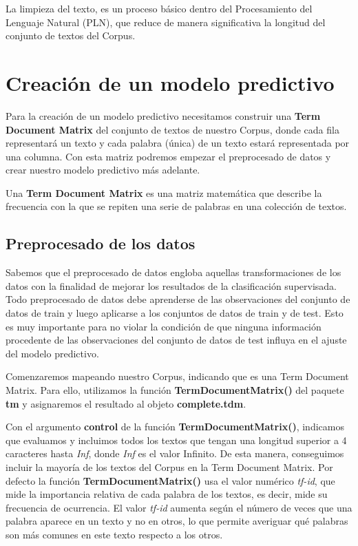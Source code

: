 \documentclass[]{article}
\begin{document}
La limpieza del texto, es un proceso básico dentro del Procesamiento del Lenguaje Natural (PLN), que reduce de manera significativa la longitud del conjunto de textos del Corpus. 

\hypertarget{creaciuxf3n-de-un-modelo-predictivo}{%
\section{Creación de un modelo
predictivo}\label{creaciuxf3n-de-un-modelo-predictivo}}

Para la creación de un modelo predictivo necesitamos construir una \textbf{Term Document Matrix} del conjunto de textos de nuestro Corpus, donde cada fila representará un texto y cada palabra (única) de un texto estará representada por una columna. Con esta matriz podremos empezar el preprocesado de datos y crear nuestro modelo predictivo más adelante.

\begin{tcolorbox}
	Una \textbf{Term Document Matrix} es una matriz matemática que describe la
	frecuencia con la que se repiten una serie de palabras en una colección
	de textos.
\end{tcolorbox}

\hypertarget{preprocesado-de-los-datos}{%
\subsection{Preprocesado de los datos}\label{preprocesado-de-los-datos}}

Sabemos que el preprocesado de datos engloba aquellas transformaciones de los datos con la finalidad de mejorar los resultados de la clasificación supervisada. Todo preprocesado de datos debe
aprenderse de las observaciones del conjunto de datos de train y luego aplicarse a los conjuntos de datos de train y de test. Esto es muy importante para no violar la condición
de que ninguna información procedente de las observaciones del conjunto de datos de test
influya en el ajuste del modelo predictivo.

Comenzaremos mapeando nuestro Corpus, indicando que es una Term
Document Matrix. Para ello, utilizamos la función \textbf{TermDocumentMatrix()} del paquete \textbf{tm} y
asignaremos el resultado al objeto \textbf{complete.tdm}. 

Con el argumento \textbf{control} de la función \textbf{TermDocumentMatrix()}, indicamos que evaluamos y incluimos todos los textos que tengan una longitud superior a 4 caracteres hasta \emph{Inf}, donde \emph{Inf} es el valor Infinito. De esta manera, conseguimos incluir la mayoría de los textos del Corpus en la Term Document Matrix. Por defecto la función \textbf{TermDocumentMatrix()} usa el valor numérico \emph{tf-id}, que mide la importancia relativa de cada palabra de los textos, es decir, mide su frecuencia de ocurrencia. El valor \emph{tf-id} aumenta según el número de veces que una palabra aparece en un texto y no en otros, lo que permite averiguar qué palabras son más comunes en este texto respecto a los otros.
\end{document}
